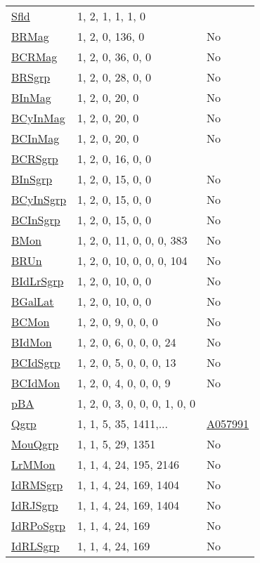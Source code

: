 {\begin{tabular}{|l|l|l|}
\hyperlink{Sfld}{Sfld}& 1, 2, 1, 1, 1, 0 &\\
\hyperlink{BRMag}{BRMag}& 1, 2, 0, 136, 0 &No\\
\hyperlink{BCRMag}{BCRMag}& 1, 2, 0, 36, 0, 0 &No\\
\hyperlink{BRSgrp}{BRSgrp}& 1, 2, 0, 28, 0, 0 &No\\
\hyperlink{BInMag}{BInMag}& 1, 2, 0, 20, 0 &No\\
\hyperlink{BCyInMag}{BCyInMag}& 1, 2, 0, 20, 0 &No\\
\hyperlink{BCInMag}{BCInMag}& 1, 2, 0, 20, 0 &No\\
\hyperlink{BCRSgrp}{BCRSgrp}& 1, 2, 0, 16, 0, 0 &\\
\hyperlink{BInSgrp}{BInSgrp}& 1, 2, 0, 15, 0, 0 &No\\
\hyperlink{BCyInSgrp}{BCyInSgrp}& 1, 2, 0, 15, 0, 0 &No\\
\hyperlink{BCInSgrp}{BCInSgrp}& 1, 2, 0, 15, 0, 0 &No\\
\hyperlink{BMon}{BMon}& 1, 2, 0, 11, 0, 0, 0, 383 &No\\
\hyperlink{BRUn}{BRUn}& 1, 2, 0, 10, 0, 0, 0, 104 &No\\
\hyperlink{BIdLrSgrp}{BIdLrSgrp}& 1, 2, 0, 10, 0, 0 &No\\
\hyperlink{BGalLat}{BGalLat}& 1, 2, 0, 10, 0, 0 &No\\
\hyperlink{BCMon}{BCMon}& 1, 2, 0, 9, 0, 0, 0 &No\\
\hyperlink{BIdMon}{BIdMon}& 1, 2, 0, 6, 0, 0, 0, 24 &No\\
\hyperlink{BCIdSgrp}{BCIdSgrp}& 1, 2, 0, 5, 0, 0, 0, 13 &No\\
\hyperlink{BCIdMon}{BCIdMon}& 1, 2, 0, 4, 0, 0, 0, 9 &No\\
\hyperlink{pBA}{pBA}& 1, 2, 0, 3, 0, 0, 0, 1, 0, 0 &\\
\hyperlink{Qgrp}{Qgrp}& 1, 1, 5, 35, 1411,... &\href{http://oeis.org/A057991}{A057991}\\
\hyperlink{MouQgrp}{MouQgrp}& 1, 1, 5, 29, 1351 &No\\
\hyperlink{LrMMon}{LrMMon}& 1, 1, 4, 24, 195, 2146 &No\\
\hyperlink{IdRMSgrp}{IdRMSgrp}& 1, 1, 4, 24, 169, 1404 &No\\
\hyperlink{IdRJSgrp}{IdRJSgrp}& 1, 1, 4, 24, 169, 1404 &No\\
\hyperlink{IdRPoSgrp}{IdRPoSgrp}& 1, 1, 4, 24, 169 &No\\
\hyperlink{IdRLSgrp}{IdRLSgrp}& 1, 1, 4, 24, 169 &No\\

\end{tabular}}
